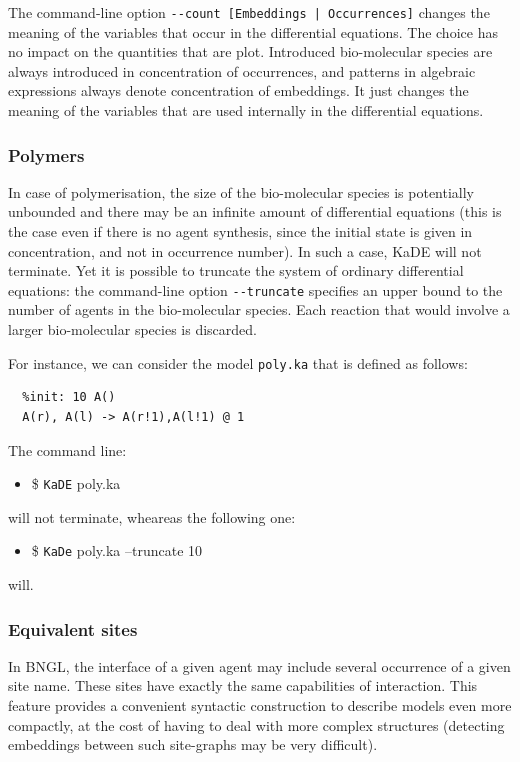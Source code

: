 \documentclass[11pt]{book}
\def\KaDE{\textsf{KaDE}}
\def\ttt#1{\texttt{#1}}
\def\ITE#1{\begin{itemize}#1\end{itemize}}
\begin{document}
The command-line option \texttt{-{}-count [Embeddings | Occurrences]}
changes the meaning of the variables that occur in the differential equations. The choice has no impact on the quantities that are plot. Introduced bio-molecular species are always introduced in
concentration of occurrences, and patterns in algebraic expressions always denote concentration of embeddings. It just changes the meaning of the variables that are used internally in the differential equations.

\subsubsection{Polymers}

In case of polymerisation, the size of the bio-molecular species is potentially  unbounded and there may be an infinite amount of differential equations (this is the case even if there is no agent synthesis, since the initial state is given in concentration, and not in occurrence number). In such a case, {\KaDE} will not terminate. Yet it is possible to truncate the system of ordinary differential equations: the command-line option \texttt{-{}-truncate} specifies an upper bound to the number of agents in the bio-molecular species. Each reaction that would involve a larger bio-molecular species is discarded.

For instance, we can consider the model \texttt{poly.ka} that is defined as follows:
\begin{lstlisting}[language=kappa]
  %agent: A(l,r)
  %init: 10 A()
  A(r), A(l) -> A(r!1),A(l!1) @ 1
\end{lstlisting}

The command line:
\ITE{\item[\$] \ttt{KaDE} poly.ka}
will not terminate, wheareas the following one:
\ITE{\item[\$] \ttt{KaDe} poly.ka --truncate 10}
will.


\subsubsection{Equivalent sites}

\label{sec:kade:ex}

In BNGL, the interface of a given agent may include several occurrence of a given site name. These sites have exactly the same capabilities of interaction. This feature provides a convenient syntactic construction to describe models even more compactly, at the cost of having to deal with more complex structures (detecting embeddings between such site-graphs may be very difficult).
\end{document}
